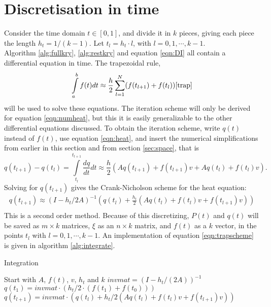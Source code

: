 \section{Discretisation in time} \label{sec:time}
Consider the time domain $t \in [0,1] $, and divide it in $k$ pieces, giving each piece the length $h_t = 1/(k-1)$. Let $t_l = h_t\cdot l$, with $l = 0,1,\cdots,k-1 $.\\

Algorithm \ref{alg:fullkry}, \ref{alg:restkry} and equation \ref{eqn:DI} all contain a differential equation in time.
The trapezoidal rule, 
\begin{equation} \label{eqn:trap}
\int \limits_a^b f(t) dt \approx \frac{h}{2} \sum \limits_{l = 1}^N(f(t_{l+1})+f(t_l)) \cite{trap}
\end{equation}
will be used to solve these equations. 
The iteration scheme will only be derived for equation \eqref{eqn:numheat}, but 
this it is easily generalizable to the other differential equations discussed.
To obtain the iteration scheme, write $q(t)$ instead of $f(t)$, use equation \eqref{eqn:heat}, and insert the numerical simplifications from earlier in this section and from section \ref{sec:space}, that is
\begin{equation}
q(t_{l+1}) - q(t_l) = \int \limits_{t_l}^{t_{l+1}} \frac{d q}{d t} dt \approx \frac{h}{2}(A q(t_{l+1})+f(t_{l+1})v +A q(t_l)+f(t_l) v) .
\end{equation}
Solving for $q(t_{l+1})$ gives the Crank-Nicholson scheme for the heat equation:
\begin{equation} \label{eqn:trapscheme}
\begin{aligned}
q(t_{l+1}) \approx (I-h_t/2 A)^{-1}(q(t_l) + \frac{h_t}{2}( A q(t_{l}) + f(t_l)v+f(t_{l+1})v))\\
\end{aligned}
\end{equation} 
This is a second order method.
Because of this discretizing, $P(t)$ and $q(t)$ will be saved as $m \times k $ matrices, $\xi$ as an $n \times k$ matrix, and $f(t)$ as a $k$ vector, in the points $t_l$ with $l = 0,1,\cdots,k-1 $. An implementation of equation \eqref{eqn:trapscheme} is given in algorithm \ref{alg:integrate}.\\
\begin{algorithm} 
\begin{algorithmic} \caption{Integration} \label{alg:integrate}  
\STATE Start with $A$, $f(t)$, $v$, $h_t$ and $k$
\STATE $invmat = (I-h_t/(2A))^{-1}$
\STATE $q(t_1) = invmat \cdot (h_t/2 \cdot (f(t_1)+f(t_0)))$
\STATE $q(t_{l+1}) = invmat \cdot (q(t_l) + h_t/2( A q(t_{l}) + f(t_l)v+f(t_{l+1})v))$
\ENDFOR
\end{algorithmic} 
\end{algorithm}

